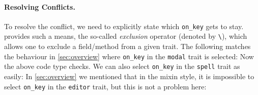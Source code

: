 \paragraph{Resolving Conflicts.}
To resolve the conflict, we need to explicitly state which
\lstinline{on_key} gets to stay. \name provides such a means, the so-called
\emph{exclusion} operator (denoted by \lstinline$\$), which allows one to
exclude a field/method from a given trait. The following matches the behaviour
in \cref{sec:overview} where \lstinline{on_key} in the \lstinline{modal} trait
is selected:
Now the above code type checks. We can also select \lstinline{on_key} in the \lstinline{spell} trait as easily:
In \cref{sec:overview} we mentioned that in the mixin style, it is impossible
to select \lstinline{on_key} in the \lstinline{editor} trait, but this is not a problem here:







